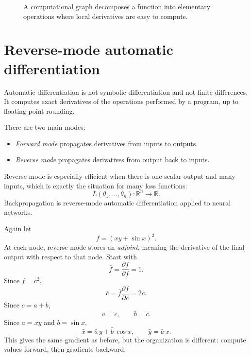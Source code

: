 \documentclass[11pt]{article}
\newcommand{\R}{\mathbb R}
\begin{document}
\begin{figure}[H]
\centering
{}
\caption{A computational graph decomposes a function into elementary operations where local derivatives are easy to compute.}
\end{figure}

\section{Reverse-mode automatic differentiation}

Automatic differentiation is not symbolic differentiation and not finite differences. It computes exact derivatives of the operations performed by a program, up to floating-point rounding.

There are two main modes:
\begin{itemize}
  \item \emph{Forward mode} propagates derivatives from inputs to outputs.
  \item \emph{Reverse mode} propagates derivatives from output back to inputs.
\end{itemize}
Reverse mode is especially efficient when there is one scalar output and many inputs, which is exactly the situation for many loss functions:
\[
L(\theta_1,\dots,\theta_n):\R^n\to\R.
\]
Backpropagation is reverse-mode automatic differentiation applied to neural networks.

\begin{workedexample}
Again let
\[
f=(xy+\sin x)^2.
\]
At each node, reverse mode stores an \emph{adjoint}, meaning the derivative of the final output with respect to that node. Start with
\[
\bar f=\frac{\partial f}{\partial f}=1.
\]
Since $f=c^2$,
\[
\bar c=\bar f\frac{\partial f}{\partial c}=2c.
\]
Since $c=a+b$,
\[
\bar a=\bar c,\qquad \bar b=\bar c.
\]
Since $a=xy$ and $b=\sin x$,
\[
\bar x=\bar a\,y+\bar b\,\cos x,
\qquad
\bar y=\bar a\,x.
\]
This gives the same gradient as before, but the organization is different: compute values forward, then gradients backward.
\end{workedexample}
\end{document}
